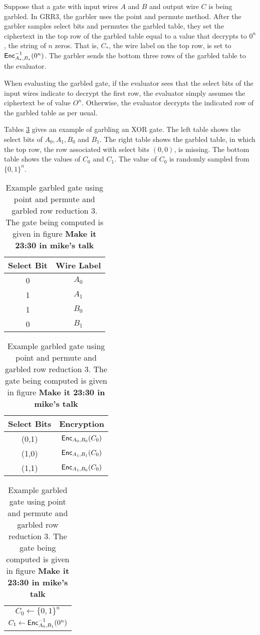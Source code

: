 Suppose that a gate with input wires $A$ and $B$ and output wire $C$ is being garbled.
In GRR3, the garbler uses the point and permute method.
After the garbler samples select bits and permutes the garbled table, they set the ciphertext in the top row of the garbled table equal to a value that decrypts to $0^n$, the string of $n$ zeros.
That is, $C_*$, the wire label on the top row, is set to $\textsf{Enc}^{-1}_{A_*, B_*}(0^n)$.
The garbler sends the bottom three rows of the garbled table to the evaluator.

When evaluating the garbled gate, if the evaluator sees that the select bits of the input wires indicate to decrypt the first row, the evaluator simply assumes the ciphertext be of value $O^n$. 
Otherwise, the evaluator decrypts the indicated row of the garbled table as per usual.

Tables \ref{tbl:grr3} gives an example of garbling an XOR gate.
The left table shows the select bits of $A_0, A_1, B_0$ and $B_1$.
The right table shows the garbled table, in which the top row, the row associated with select bits $(0,0)$, is missing.
The bottom table shows the values of $C_0$ and $C_1$.
The value of $C_0$ is randomly sampled from $\{0,1\}^n$.

\begin{table}
    \centering
    \begin{tabular}{|c|c|}
        \hline
        Select Bit & Wire Label \\
        \hline
        0 & $A_0$ \\
        1 & $A_1$ \\
        1 & $B_0$ \\
        0 & $B_1$ \\
        \hline
    \end{tabular}
    \qquad
    \begin{tabular}{|c|c|}
        \hline
        Select Bits & Encryption \\
        \hline
        (0,1) & $\textsf{Enc}_{A_0, B_0}(C_0)$ \\
        (1,0) & $\textsf{Enc}_{A_1, B_1}(C_0)$ \\
        (1,1) & $\textsf{Enc}_{A_1, B_0}(C_0)$ \\
        \hline
    \end{tabular}
    \qquad
    \begin{tabular}{|c|}
        \hline
        $C_0 \gets \{0,1\}^n$ \\
        $C_1 \gets \textsf{Enc}_{A_0, B_1}^{-1}(0^n)$ \\
        \hline
    \end{tabular}
    \caption{Example garbled gate using point and permute and garbled row reduction 3. The gate being computed is given in figure \textbf{Make it 23:30 in mike's talk}}
    \label{tbl:grr3}
\end{table}

